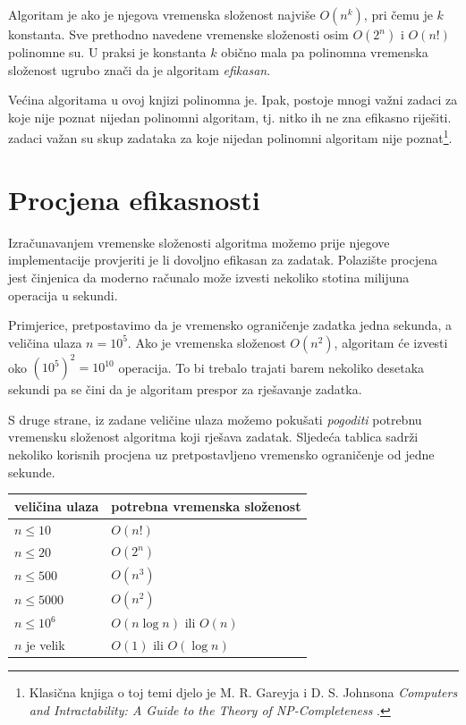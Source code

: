 Algoritam je 
ako je njegova vremenska složenost najviše $O(n^k)$,
pri čemu je $k$ konstanta.
Sve prethodno navedene vremenske složenosti osim
$O(2^n)$ i $O(n!)$ polinomne su.
U praksi je konstanta $k$ obično mala
pa polinomna vremenska složenost
ugrubo znači da je algoritam \emph{efikasan}.


Većina algoritama u ovoj knjizi polinomna je.
Ipak, postoje mnogi važni zadaci za koje
nije poznat nijedan polinomni algoritam, tj.
nitko ih ne zna efikasno riješiti.
 zadaci važan su skup
zadataka za koje nijedan polinomni algoritam
nije poznat\footnote{Klasična knjiga o toj temi djelo je
M. R. Gareyja i D. S. Johnsona
\emph{Computers and Intractability: A Guide to the Theory
of NP-Completeness} \cite{gar79}.}.

\section{Procjena efikasnosti}

Izračunavanjem vremenske složenosti algoritma
možemo prije njegove
implementacije provjeriti je li
dovoljno efikasan za zadatak.
Polazište procjena jest činjenica da
moderno računalo može izvesti nekoliko stotina
milijuna operacija u sekundi.

Primjerice, pretpostavimo da je vremensko ograničenje
zadatka jedna sekunda, a veličina ulaza $n=10^5$.
Ako je vremenska složenost $O(n^2)$,
algoritam će izvesti oko $(10^5)^2=10^{10}$ operacija.
To bi trebalo trajati barem nekoliko desetaka sekundi
pa se čini da je algoritam prespor za rješavanje zadatka.

S druge strane, iz zadane veličine ulaza
možemo pokušati \emph{pogoditi}
potrebnu vremensku složenost algoritma
koji rješava zadatak.
Sljedeća tablica sadrži nekoliko korisnih procjena
uz pretpostavljeno vremensko ograničenje od jedne sekunde.

\begin{center}
\begin{tabular}{ll}
veličina ulaza & potrebna vremenska složenost \\
\hline
$n \le 10$ & $O(n!)$ \\
$n \le 20$ & $O(2^n)$ \\
$n \le 500$ & $O(n^3)$ \\
$n \le 5000$ & $O(n^2)$ \\
$n \le 10^6$ & $O(n \log n)$ ili $O(n)$ \\
$n$ je velik & $O(1)$ ili $O(\log n)$ \\
\end{tabular}
\end{center}

